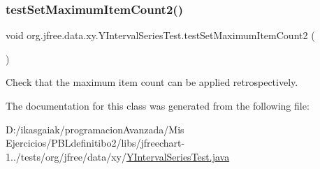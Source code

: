 \subsubsection{\texorpdfstring{test\+Set\+Maximum\+Item\+Count2()}{testSetMaximumItemCount2()}}
{\footnotesize\ttfamily void org.\+jfree.\+data.\+xy.\+Y\+Interval\+Series\+Test.\+test\+Set\+Maximum\+Item\+Count2 (\begin{DoxyParamCaption}{ }\end{DoxyParamCaption})}

Check that the maximum item count can be applied retrospectively. 

The documentation for this class was generated from the following file\+:\begin{DoxyCompactItemize}
\item 
D\+:/ikasgaiak/programacion\+Avanzada/\+Mis Ejercicios/\+P\+B\+Ldefinitibo2/libs/jfreechart-\/1../tests/org/jfree/data/xy/\mbox{\hyperlink{_y_interval_series_test_8java}{Y\+Interval\+Series\+Test.\+java}}\end{DoxyCompactItemize}
